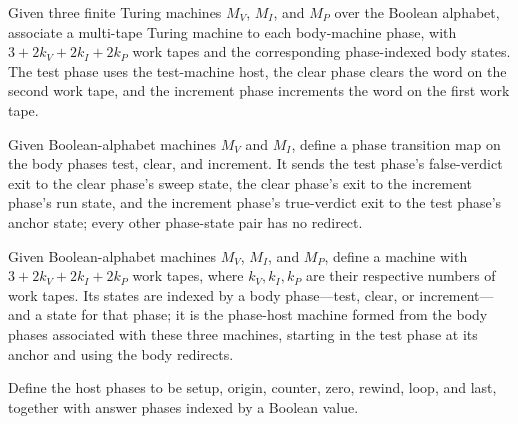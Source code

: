 \begin{definition}
\label{Complexity.b2b_bodyPhases}
\leanok
{}
Given three finite Turing machines $M_V$, $M_I$, and $M_P$ over the Boolean alphabet,
associate a multi-tape Turing machine to each body-machine phase, with
$3+2k_V+2k_I+2k_P$ work tapes and the corresponding phase-indexed body states. The test
phase uses the test-machine host, the clear phase clears the word on the second work
tape, and the increment phase increments the word on the first work tape.
\end{definition}

\begin{definition}
\label{Complexity.b2b_bodyRedirect}
\leanok
{}
Given Boolean-alphabet machines $M_V$ and $M_I$, define a phase transition map on the
body phases test, clear, and increment. It sends the test phase's false-verdict exit to
the clear phase's sweep state, the clear phase's exit to the increment phase's run
state, and the increment phase's true-verdict exit to the test phase's anchor state;
every other phase-state pair has no redirect.
\end{definition}

\begin{definition}
\label{Complexity.b2b_bodyTM}
\leanok
{}
Given Boolean-alphabet machines $M_V$, $M_I$, and $M_P$, define a machine with
$3+2k_V+2k_I+2k_P$ work tapes, where $k_V,k_I,k_P$ are their respective numbers of work
tapes. Its states are indexed by a body phase—test, clear, or increment—and a state for
that phase; it is the phase-host machine formed from the body phases associated with
these three machines, starting in the test phase at its anchor and using the body
redirects.
\end{definition}

\begin{definition}
\label{Complexity.B2bHostPhase}
\leanok
Define the host phases to be setup, origin, counter, zero, rewind, loop, and last,
together with answer phases indexed by a Boolean value.
\end{definition}

